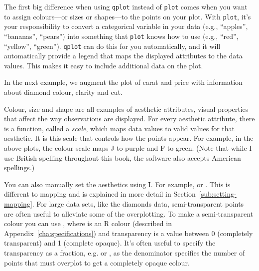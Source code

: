 The first big difference when using {\tt qplot} instead of {\tt plot} comes when you want to assign colours---or sizes or shapes---to the points on your plot.  With {\tt plot}, it's your responsibility to convert a categorical variable in your data (e.g., ``apples'', ``bananas'', ``pears'') into something that {\tt plot} knows how to use (e.g., ``red'', ``yellow'', ``green'').  {\tt qplot} can do this for you automatically, and it will automatically provide a legend that maps the displayed attributes to the data values.  This makes it easy to include additional data on the plot.  

In the next example, we augment the plot of carat and price with information about diamond colour, clarity and cut.

% 


Colour, size and shape are all examples of aesthetic attributes, visual properties that affect the way observations are displayed.  For every aesthetic attribute, there is a function, called a \emph{scale}, which maps data values to valid values for that aesthetic.  It is this scale that controls how the points appear.  For example, in the above plots, the colour scale maps J to purple and F to green. (Note that while I use British spelling throughout this book, the software also accepts American spellings.)

You can also manually set the aesthetics using \f{I}.  For example,  or .  This is different to mapping and is explained in more detail in Section~\ref{sub:setting-mapping}.  For large data sets, like the diamonds data, semi-transparent points are often useful to alleviate some of the overplotting.  To make a semi-transparent colour you can use , where  is an R colour (described in Appendix~\ref{cha:specifications}) and transparency is a value between 0 (completely transparent) and 1 (complete opaque).  It's often useful to specify the transparency as a fraction, e.g.  or , as the denominator specifies the number of points that must overplot to get a completely opaque colour.

